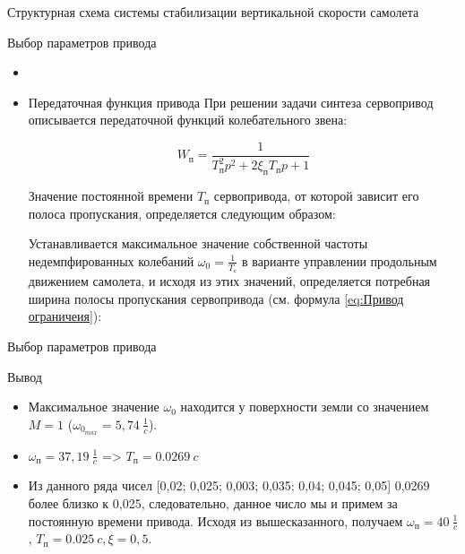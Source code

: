 \begin{frame}{Структурная схема системы стабилизации вертикальной скорости самолета}
\end{frame}

\begin{frame}{Выбор параметров привода}
    \begin{itemize}
    \item <+-> []
    \item <+-> []   \begin{block}{Передаточная функция привода}
        При решении задачи синтеза сервопривод описывается передаточной функций колебательного звена:
    
    \begin{equation}
    \label{eq:Привод ограничеия}
        W_{\text{п}}=\frac{1}{T_\text{п}^2p^2+2\xi_\text{п}T_\text{п}p+1}
    \end{equation}
    
    Значение постоянной времени  $T_\text{п}$ сервопривода, от которой зависит его полоса пропускания, определяется следующим образом:
    
    Устанавливается максимальное значение собственной частоты  недемпфированных колебаний $\omega_0=\frac{1}{T_{\text{с}}}$ в варианте управлении продольным движением самолета, и исходя из этих значений, определяется потребная ширина полосы пропускания сервопривода (см. формула \ref{eq:Привод ограничеия}):
    \end{block}
\end{itemize}
\end{frame}

\begin{frame}{Выбор параметров привода}
    \begin{block}{Вывод}
        \begin{itemize}
            \item Максимальное значение $\omega_0$ находится у поверхности земли со значением $M = 1$ ($\omega_0_{max} = 5,74 \ \frac{1}{c}$).
            \item $\omega_\text{п} = 37,19 \ \frac{1}{c}$ => $T_{\text{п}} = 0.0269 \ c$ 
            \item Из данного ряда чисел [0,02; 0,025; 0,003; 0,035; 0,04; 0,045; 0,05] 0,0269 более близко к 0,025, следовательно, данное число мы и примем за постоянную времени привода. Исходя из вышесказанного, получаем $\omega_\text{п} = 40 \ \frac{1}{c}$ , $T_{\text{п}} = 0.025 \ c, \xi = 0,5$.
        \end{itemize}
    \end{block}
\end{frame}


